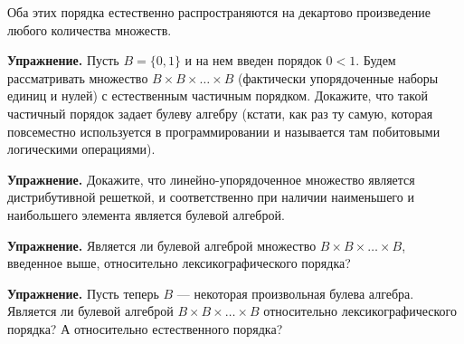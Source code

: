 Оба этих порядка естественно распространяются на декартово произведение любого количества множеств.

{\bfseries Упражнение.} Пусть $B = \{0, 1\}$ и на нем введен порядок $0 < 1$. Будем рассматривать множество $B\times B\times \ldots \times B$ (фактически упорядоченные наборы единиц и нулей) с естественным частичным порядком. Докажите, что такой частичный порядок задает булеву алгебру (кстати, как раз ту самую, которая повсеместно используется в программировании и называется там побитовыми логическими операциями).

{\bfseries Упражнение.} Докажите, что линейно-упорядоченное множество является дистрибутивной решеткой, и соответственно при наличии наименьшего и наибольшего элемента является булевой алгеброй.

{\bfseries Упражнение.} Является ли булевой алгеброй множество $B\times B \times \ldots \times B$, введенное выше, относительно лексикографического порядка?

{\bfseries Упражнение.} Пусть теперь $B$ — некоторая произвольная булева алгебра. Является ли булевой алгеброй $B\times B \times \ldots \times B$ относительно лексикографического порядка? А относительно естественного порядка?
